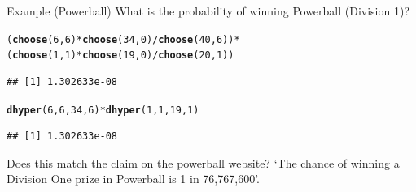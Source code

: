\documentclass[t,xcolor=pdftex,dvipsnames,table]{beamer}
\makeatletter
\newcommand{\hlnum}[1]{\textcolor[rgb]{0.686,0.059,0.569}{#1}}%
\newcommand{\hlopt}[1]{\textcolor[rgb]{0,0,0}{#1}}%
\newcommand{\hlstd}[1]{\textcolor[rgb]{0.345,0.345,0.345}{#1}}%
\newcommand{\hlkwd}[1]{\textcolor[rgb]{0.737,0.353,0.396}{\textbf{#1}}}%
\newenvironment{kframe}{%
 \def\at@end@of@kframe{}%
 \ifinner\ifhmode%
  \def\at@end@of@kframe{\end{minipage}}%
  \begin{minipage}{\columnwidth}%
 \fi\fi%
 \def\FrameCommand##1{\hskip\@totalleftmargin \hskip-\fboxsep
 \colorbox{shadecolor}{##1}\hskip-\fboxsep
     \hskip-\linewidth \hskip-\@totalleftmargin \hskip\columnwidth}%
 \MakeFramed {\advance\hsize-\width
   \@totalleftmargin\z@ \linewidth\hsize
   \@setminipage}}%
 {\par\unskip\endMakeFramed%
 \at@end@of@kframe}
\newenvironment{knitrout}{}{} %
\makeatother
\begin{document}
\begin{frame}[fragile]{}
\begin{block}{Example (Powerball)}
What is the probability of winning Powerball (Division 1)?  
\end{block}

\begin{knitrout}
\color{fgcolor}\begin{kframe}
\begin{alltt}
\hlstd{(}\hlkwd{choose}\hlstd{(}\hlnum{6}\hlstd{,}\hlnum{6}\hlstd{)}\hlopt{*}\hlkwd{choose}\hlstd{(}\hlnum{34}\hlstd{,}\hlnum{0}\hlstd{)}\hlopt{/}\hlkwd{choose}\hlstd{(}\hlnum{40}\hlstd{,}\hlnum{6}\hlstd{))}\hlopt{*}
  \hlstd{(}\hlkwd{choose}\hlstd{(}\hlnum{1}\hlstd{,}\hlnum{1}\hlstd{)}\hlopt{*}\hlkwd{choose}\hlstd{(}\hlnum{19}\hlstd{,}\hlnum{0}\hlstd{)}\hlopt{/}\hlkwd{choose}\hlstd{(}\hlnum{20}\hlstd{,}\hlnum{1}\hlstd{))}
\end{alltt}
\begin{verbatim}
## [1] 1.302633e-08
\end{verbatim}
\end{kframe}
\end{knitrout}

\begin{knitrout}
\color{fgcolor}\begin{kframe}
\begin{alltt}
\hlkwd{dhyper}\hlstd{(}\hlnum{6}\hlstd{,}\hlnum{6}\hlstd{,}\hlnum{34}\hlstd{,}\hlnum{6}\hlstd{)}\hlopt{*}\hlkwd{dhyper}\hlstd{(}\hlnum{1}\hlstd{,}\hlnum{1}\hlstd{,}\hlnum{19}\hlstd{,}\hlnum{1}\hlstd{)}
\end{alltt}
\begin{verbatim}
## [1] 1.302633e-08
\end{verbatim}
\end{kframe}
\end{knitrout}

\vspace{.5cm}
Does this match the claim on the powerball website?
`The chance of winning a Division One prize in Powerball is 1 in 76,767,600'.
\href{https://www.ozlotteries.com/play/powerball}{}

\end{frame}
\end{document}
